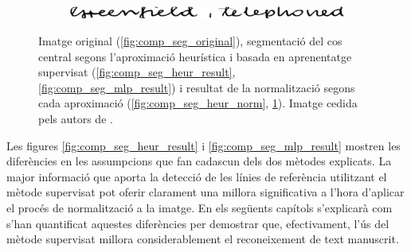 \begin{figure}
\begin{subfigure}[b]{0.9\textwidth}
\centering
\includegraphics[width=\textwidth]{images/comp_seg_mlp_norm.eps}
\caption{}\label{fig:comp_seg_mlp_norm}
\end{subfigure}
\caption{Imatge original (\ref{fig:comp_seg_original}), segmentació del cos central segons l'aproximació heurística i basada en aprenentatge supervisat (\ref{fig:comp_seg_heur_result}, \ref{fig:comp_seg_mlp_result}) i resultat de la normalització segons cada aproximació (\ref{fig:comp_seg_heur_norm}, \ref{fig:comp_seg_mlp_norm}). Imatge cedida pels autors de \cite{DBLP:conf/pris/Gorbe-MoyaEZB08}.}\label{fig:comp_seg}
\end{figure}

Les figures \ref{fig:comp_seg_heur_result} i \ref{fig:comp_seg_mlp_result} mostren les diferències en les assumpcions que fan cadascun dels dos mètodes explicats. La major informació que aporta la detecció de les línies de referència utilitzant el mètode supervisat pot oferir clarament una millora significativa a l'hora d'aplicar el procés de normalització a la imatge. En els següents capítols s'explicarà com s'han quantificat aquestes diferències per demostrar que, efectivament, l'ús del mètode supervisat millora considerablement el reconeixement de text manuscrit.